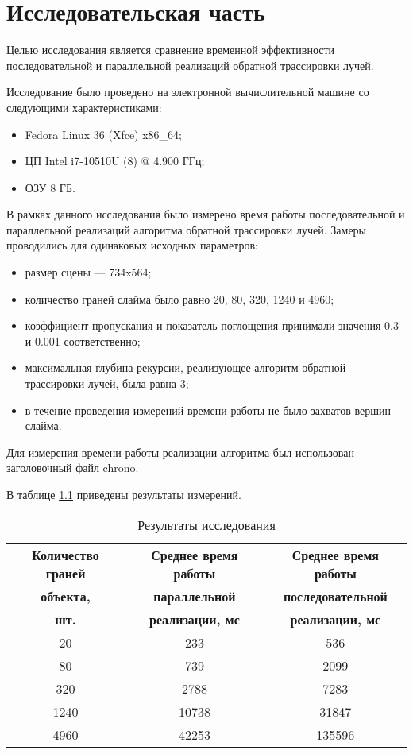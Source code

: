 \chapter{Исследовательская часть}

Целью исследования является сравнение временной эффективности последовательной и параллельной реализаций обратной трассировки лучей.

Исследование было проведено на электронной вычислительной машине со следующими характеристиками:

\begin{itemize}
	\item Fedora Linux 36 (Xfce) x86\_64;
	\item ЦП Intel i7-10510U (8) @ 4.900 ГГц;
	\item ОЗУ 8 ГБ.
\end{itemize}

В рамках данного исследования было измерено время работы последовательной и параллельной реализаций алгоритма обратной трассировки лучей. Замеры проводились для одинаковых исходных параметров:
\begin{itemize}
	\item размер сцены --- 734x564;
	
	\item количество граней слайма было равно 20, 80, 320, 1240 и 4960;
	
	\item коэффициент пропускания и показатель поглощения принимали значения 0.3 и 0.001 соответственно;
	
	\item максимальная глубина рекурсии, реализующее алгоритм обратной трассировки лучей, была равна 3;
	
	\item в течение проведения измерений времени работы не было захватов вершин слайма.
\end{itemize}

Для измерения времени работы реализации алгоритма был использован заголовочный файл chrono.

В таблице \ref{restable} приведены результаты измерений.

\begin{table}[H]
	\begin{center}
		\caption{\label{restable}Результаты исследования}
		\begin{tabular}{|c|c|c|}
			\hline
			\bf{Количество граней} & \bf{Среднее время работы} & \bf{Среднее время работы}\\
			\bf{объекта,} & \bf{параллельной} & \bf{последовательной}\\
			\bf{шт.} & \bf{реализации, мс} & \bf{реализации, мс}\\
			\hline
			20 & 233 & 536\\
			\hline
			80 & 739 & 2099\\
			\hline
			320 & 2788 & 7283\\
			\hline
			1240 & 10738 & 31847\\
			\hline
			4960 & 42253 & 135596\\
			\hline
		\end{tabular}
	\end{center}
\end{table}

